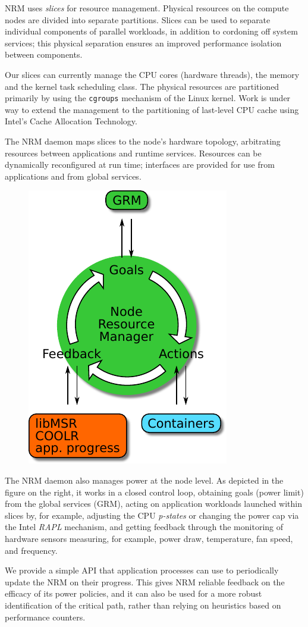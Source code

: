 NRM uses \emph{slices} for resource management.  Physical resources on the
compute nodes are divided into separate partitions.  Slices can be used to
separate individual components of parallel workloads, in addition to
cordoning off system services; this physical separation ensures an improved
performance isolation between components.

Our slices can currently manage the CPU cores (hardware threads), the
memory and the kernel task scheduling class.  The physical
resources are partitioned primarily by using the \texttt{cgroups} mechanism
of the Linux kernel.  Work is under way to extend the management to 
the partitioning of last-level CPU cache using Intel's Cache Allocation
Technology.

The NRM daemon maps slices to the node's hardware topology, arbitrating
resources between applications and runtime services. Resources can be
dynamically reconfigured at run time; interfaces are provided for use from
applications and from global services.

\begin{figure}
\vspace{-12pt}\includegraphics[width=.18\textwidth]{projects/2.3.1-PMR/2.3.1.19-Argo-PowerSteering/nrm-loop}
\end{figure}
The NRM daemon also manages power at the node level.  As depicted in the
figure on the right, it works in a closed control loop, obtaining goals
(power limit) from the global services (GRM), acting on application
workloads launched within slices by, for example, adjusting the CPU
\emph{p-states} or changing the power cap via the Intel \emph{RAPL}
mechanism, and getting feedback through the monitoring of hardware sensors
measuring, for example, power draw, temperature, fan speed, and frequency.

We provide a simple API that application processes can use to periodically
update the NRM on their progress.  This gives NRM reliable feedback on the
efficacy of its power policies, and it can also be used for a more robust
identification of the critical path, rather than relying on heuristics
based on performance counters.

